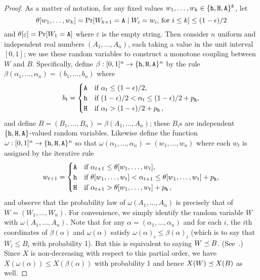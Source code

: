   \begin{proof}
    As a
    matter of notation, for any fixed values
    $w_1, \ldots, w_k \in \{\mathtt{h}, \mathtt{H}, \mathtt{A}\}^k$, let
    \[
      \theta[w_1, \ldots, w_k] = \Pr[ W_{k+1} = \mathtt{A} \mid
      \text{$W_i = w_i$, for $i \leq k$}] \leq (1 - \epsilon)/2
    \]
    and $\theta[\varepsilon] = \Pr[W_1 = \mathtt{A}]$ 
    where $\varepsilon$ is the empty string. Then consider $n$ uniform and
    independent real numbers $(A_1, \ldots, A_n)$, each taking a value
    in the unit interval $[0,1]$; we use these random variables to construct a monotone
    coupling between $W$ and $B$. 
    Specifically, define $\beta: [0,1]^n \rightarrow \{\mathtt{h}, \mathtt{H}, \mathtt{A}\}^n$
    by the rule $\beta(\alpha_1, \ldots, \alpha_n) = (b_1, \ldots, b_n)$
    where
    \[
      b_t = \begin{cases} 
        \mathtt{A} & \text{if $\alpha_t \leq (1-\epsilon)/2$},\\
        \mathtt{h} & \text{if $(1-\epsilon)/2 < \alpha_t \leq (1-\epsilon)/2 + p_{\mathtt{h}}$},\\
        \mathtt{H} & \text{if $\alpha_t > (1-\epsilon)/2 + p_{\mathtt{h}}$}\,,
      \end{cases}
    \]
    and define
    $B = (B_1, \ldots, B_n) = \beta(A_1, \ldots, A_n)$; these
    $B_i$s are independent $\{\mathtt{h},\mathtt{H},\mathtt{A}\}$-valued random variables.
    Likewise define the function
    $\omega:[0,1]^n \rightarrow \{\mathtt{h},\mathtt{H},\mathtt{A}\}^n$ so that
    $\omega(\alpha_1, \ldots, \alpha_n) = (w_1, \ldots, w_n)$
    where each $w_t$ is assigned by the iterative rule
    \[
      w_{t+1} = \begin{cases} 
        \mathtt{A} & \text{if $\alpha_{t+1} \leq \theta[w_1, \ldots, w_t]$},\\
        \mathtt{h} & \text{if $\theta[w_1, \ldots, w_t] < \alpha_{t+1} \leq \theta[w_1, \ldots, w_t] + p_{\mathtt{h}}$},\\
        \mathtt{H} & \text{if $\alpha_{t+1} > \theta[w_1, \ldots, w_t] + p_{\mathtt{h}}$}\,,
      \end{cases}
    \]
    and observe that the probability law of
    $\omega(A_1, \ldots, A_n)$ is precisely that of
    $W = (W_1, \ldots, W_n)$. For convenience, we simply identify the
    random variable $W$ with $\omega(A_1, \ldots, A_n)$. Note
    that for any $\alpha = (\alpha_1, \ldots, \alpha_n)$ and for each
    $i$, the $i$th coordinates of $\beta(\alpha)$ and $\omega(\alpha)$ satisfy
    $\omega(\alpha)_i \leq \beta(\alpha)_i$ 
    (which is to say that $W_i \leq B_i$ with probability 1). 
    But this is equivalent to saying $W \preceq B$. 
    (See~\cite[Lemma 22.5]{LevinPeres}.) 
    Since $X$ is non-decreasing with respect to this partial order, 
    we have  
    $X(\omega(\alpha)) \leq X(\beta(\alpha))$ with probability 1 and
    hence $X(W) \preceq X(B)$ as well. 

  \end{proof}




